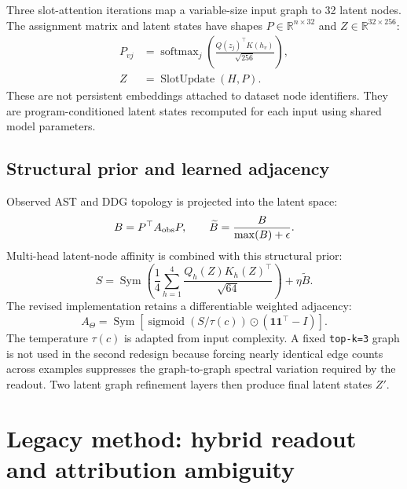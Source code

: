 \documentclass[11pt,a4paper]{article}
\newcommand{\R}{\mathbb{R}}
\newcommand{\sigmoid}{\operatorname{sigmoid}}
\newcommand{\code}[1]{\texttt{#1}}
\begin{document}
Three slot-attention iterations map a variable-size input graph to 32 latent
nodes. The assignment matrix and latent states have shapes
$P\in\R^{n\times32}$ and $Z\in\R^{32\times256}$:
\begin{align}
P_{vj}&=\operatorname{softmax}_{j}
\left(\frac{Q(z_j)^\top K(h_v)}{\sqrt{256}}\right),\\
Z&=\operatorname{SlotUpdate}(H,P).
\end{align}
These are not persistent embeddings attached to dataset node identifiers.
They are program-conditioned latent states recomputed for each input using
shared model parameters.

\subsection{Structural prior and learned adjacency}

Observed AST and DDG topology is projected into the latent space:
\begin{equation}
B=P^\top A_{\rm obs}P,
\qquad
\widetilde B=\frac{B}{\max(B)+\epsilon}.
\end{equation}
Multi-head latent-node affinity is combined with this structural prior:
\begin{equation}
S=\operatorname{Sym}\left(
\frac{1}{4}\sum_{h=1}^{4}
\frac{Q_h(Z)K_h(Z)^\top}{\sqrt{64}}
\right)+\eta\widetilde B.
\end{equation}
The revised implementation retains a differentiable weighted adjacency:
\begin{equation}
A_\Theta=\operatorname{Sym}\left[
\sigmoid\left(S/\tau(c)\right)\odot
(\mathbf 1\mathbf 1^\top-I)\right].
\end{equation}
The temperature $\tau(c)$ is adapted from input complexity. A fixed
\code{top-k=3} graph is not used in the second redesign because forcing nearly
identical edge counts across examples suppresses the graph-to-graph spectral
variation required by the readout. Two latent graph refinement layers then
produce final latent states $Z'$.

\section{Legacy method: hybrid readout and attribution ambiguity}
\end{document}
